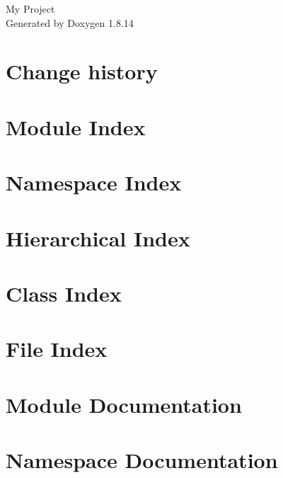 \documentclass[twoside]{book}
\newcommand{\+}{\discretionary{\mbox{\scriptsize$\hookleftarrow$}}{}{}}
\newcommand{\clearemptydoublepage}{%
  \newpage{\pagestyle{empty}\cleardoublepage}%
}
\begin{document}
\hypersetup{pageanchor=false,
             bookmarksnumbered=true,
             pdfencoding=unicode
            }
\begin{titlepage}
\vspace*{7cm}
\begin{center}%
{\Large My Project }\\
\vspace*{1cm}
{\large Generated by Doxygen 1.8.14}\\
\end{center}
\end{titlepage}
\clearemptydoublepage
{}
\tableofcontents
\clearemptydoublepage
{}
\hypersetup{pageanchor=true}

\chapter{Change history}
\label{_release}

\chapter{Module Index}

\chapter{Namespace Index}

\chapter{Hierarchical Index}

\chapter{Class Index}

\chapter{File Index}

\chapter{Module Documentation}


\chapter{Namespace Documentation}


\end{document}
